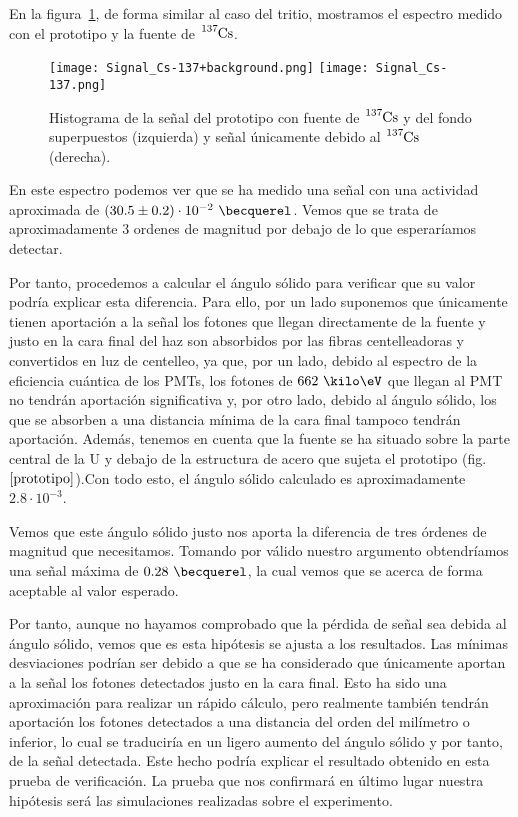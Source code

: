 En la figura~\ref{senalcesio}, de forma similar al caso del tritio, mostramos el espectro medido con el prototipo y la fuente de $\ce{^{137}Cs}$.

\begin{figure}[htb]
\centering
{
\texttt{[image: Signal\_Cs-137+background.png]} 
}
{
\texttt{[image: Signal\_Cs-137.png]} 
}
\caption{Histograma de la señal del prototipo con fuente de $\ce{^{137}Cs}$ y del fondo superpuestos (izquierda) y señal únicamente debido al $\ce{^{137}Cs}$ (derecha).\label{senalcesio}}
\end{figure}

En este espectro podemos ver que se ha medido una señal con una actividad aproximada de $(30.5 \pm 0.2) \cdot 10^{-2}~\becquerel$. Vemos que se trata de aproximadamente 3 ordenes de magnitud por debajo de lo que esperaríamos detectar.

Por tanto, procedemos a calcular el ángulo sólido para verificar que su valor podría explicar esta diferencia. Para ello, por un lado suponemos que únicamente tienen aportación a la señal los fotones que llegan directamente de la fuente y justo en la cara final del haz son absorbidos por las fibras centelleadoras y convertidos en luz de centelleo,  ya que, por un lado, debido al espectro de la eficiencia cuántica de los PMTs, los fotones de $662~\kilo\eV$ que llegan al PMT no tendrán aportación significativa y, por otro lado, debido al ángulo sólido, los que se absorben a una distancia mínima de la cara final tampoco tendrán aportación. Además, tenemos en cuenta que la fuente se ha situado sobre la parte central de la U y debajo de la estructura de acero que sujeta el prototipo (fig. $\ref{prototipo}$).Con todo esto, el ángulo sólido calculado es aproximadamente $2.8 \cdotp 10^{-3}$. 

Vemos que este ángulo sólido justo nos aporta la diferencia de tres órdenes de magnitud que necesitamos. Tomando por válido nuestro argumento obtendríamos una señal máxima de $0.28~\becquerel$, la cual vemos que se acerca de forma aceptable al valor esperado.

Por tanto, aunque no hayamos comprobado que la pérdida de señal sea debida al ángulo sólido, vemos que es esta hipótesis se ajusta  a los resultados. Las mínimas desviaciones podrían ser debido a que se ha considerado que únicamente aportan a la señal los fotones detectados justo en la cara final. Esto ha sido una aproximación para realizar un rápido cálculo, pero realmente también tendrán aportación los fotones detectados a una distancia del orden del milímetro o inferior, lo cual se traduciría en un ligero aumento del ángulo sólido y por tanto, de la señal detectada. Este hecho podría explicar  el resultado obtenido en esta prueba de verificación. La prueba que nos confirmará en último lugar nuestra hipótesis será las simulaciones realizadas sobre el experimento.
